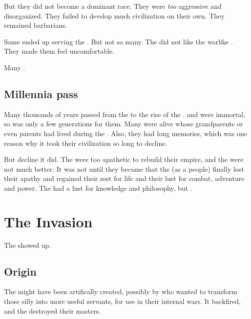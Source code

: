 But they did not become a dominant race. 
They were \emph{too} aggressive and disorganized. 
They failed to develop much civilization on their own. 
They remained barbarians. 

Some \cregorrs{} ended up serving the \quiljaaran. 
But not so many. 
The \quiljaaran{} did not like the warlike \cregorrs. 
They made them feel uncomfortable. 

Many \cregorrs{} .









\subsection{Millennia pass}
Many thousands of years passed from the \firstbanewar{} to the rise of the \aryothim. 
\Dragons and \quiljaaran{} were immortal, so  was only a few generations for them. 
Many were alive whose grandparents or even parents had lived during the \banewar. 
Also, they had long memories, which was one reason why it took their civilization so long to decline. 

But decline it did.
The \quiljaaran{} were too apathetic to rebuild their empire, and the \dragons were not much better.
It was not until they became \dzraicchenosses{} that the \dragons (as a people) finally lost their apathy and regained their zest for life and their lust for combat, adventure and power. 
The \quiljaaran{} had a lust for knowledge and philosophy, but . 
















\section[The Aryoth Invasion]{The \Aryoth{} Invasion}
The \aryothim{} showed up. 





\subsection{Origin}
The \aryothim{} might have been artifically created, possibly by \ophidians{} who wanted to transform those silly \nephilim{} into more useful servants, for use in their internal wars. 
It backfired, and the \aryothim{} destroyed their masters.

